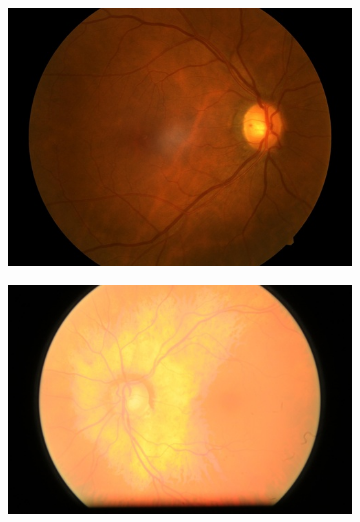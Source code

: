 \documentclass[12pt]{article}
\begin{document}
\begin{figure}
    \centering
    \begin{subfigure}[b]{0.2\textwidth}
        \centering
        \includegraphics[width=\textwidth]{images/examples_from_dataset/TRAIN000282.JPG}
        \label{fig:images_variations_1_1}
    \end{subfigure}
    \hfill
    \begin{subfigure}[b]{0.2\textwidth}
        \centering
        \includegraphics[width=\textwidth]{images/examples_from_dataset/TRAIN012425.JPG}
        \label{fig:images_variations_1_2}
    \end{subfigure}
    \hfill
    \begin{subfigure}[b]{0.2\textwidth}
        \centering

\end{subfigure}
\end{figure}
\end{document}
